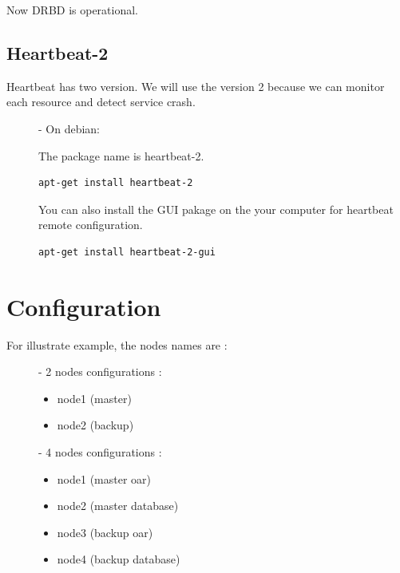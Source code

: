\documentclass[a4paper,10pt]{report}
\begin{document}
Now DRBD is operational.


\section{Heartbeat-2}
Heartbeat has two version. We will use the version 2 because we can monitor each resource and detect service crash.
\begin{description}
\item[]- On debian:

The package name is heartbeat-2.
\begin{lstlisting}
apt-get install heartbeat-2
\end{lstlisting}
You can also install the GUI pakage on the your computer for heartbeat remote configuration.
\begin{lstlisting}
apt-get install heartbeat-2-gui
\end{lstlisting}
\end{description}











\chapter{Configuration}

For illustrate example, the nodes names are :
\begin{description}
\item[]- 2 nodes configurations : 
\begin{itemize}
\item node1 (master)
\item node2 (backup)
\end{itemize}

\item[]- 4 nodes configurations :
\begin{itemize}
\item node1 (master oar)
\item node2 (master database)
\item node3 (backup oar)
\item node4 (backup database)
\end{itemize}
\end{description}
\end{document}
